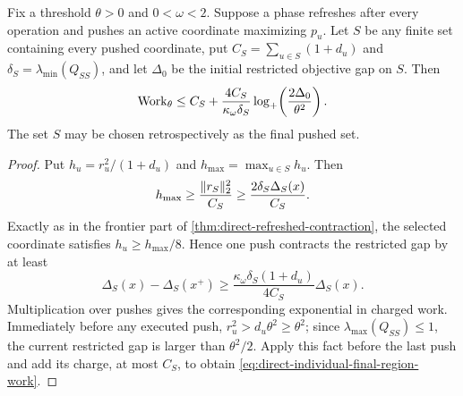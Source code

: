 \begin{lemma}
\label{lem:direct-individual-final-region}
Fix a threshold $\theta>0$ and $0<\omega<2$.  Suppose a phase refreshes after
every operation and pushes an active coordinate maximizing $p_u$.  Let $S$
be any finite set containing every pushed coordinate, put
$C_S=\sum_{u\in S}(1+d_u)$ and
$\delta_S=\lambda_{\min}(Q_{SS})$, and let $\Delta_0$ be the initial
restricted objective gap on $S$.  Then
\begin{equation}
 \operatorname{Work}_\theta
 \leq C_S+
 \frac{4C_S}{\kappa_\omega\delta_S}
 \log_+\!\left(\frac{2\Delta_0}{\theta^2}\right).
 \label{eq:direct-individual-final-region-work}
\end{equation}
The set $S$ may be chosen retrospectively as the final pushed set.
\end{lemma}

\begin{proof}
Put $h_u=r_u^2/(1+d_u)$ and $h_{\max}=\max_{u\in S}h_u$.  Then
\begin{equation*}
 h_{\max}\geq\frac{\lVert r_S\rVert_2^2}{C_S}
 \geq\frac{2\delta_S\Delta_S(x)}{C_S}.
\end{equation*}
Exactly as in the frontier part of
\cref{thm:direct-refreshed-contraction}, the selected coordinate satisfies
$h_u\geq h_{\max}/8$.  Hence one push contracts the restricted gap by at
least
\begin{equation*}
 \Delta_S(x)-\Delta_S(x^+)
 \geq\frac{\kappa_\omega\delta_S(1+d_u)}{4C_S}\Delta_S(x).
\end{equation*}
Multiplication over pushes gives the corresponding exponential in charged
work.  Immediately before any executed push,
$r_u^2>d_u\theta^2\geq\theta^2$; since
$\lambda_{\max}(Q_{SS})\leq1$, the current restricted gap is larger than
$\theta^2/2$.  Apply this fact before the last push and add its charge, at
most $C_S$, to obtain \cref{eq:direct-individual-final-region-work}.
\end{proof}

